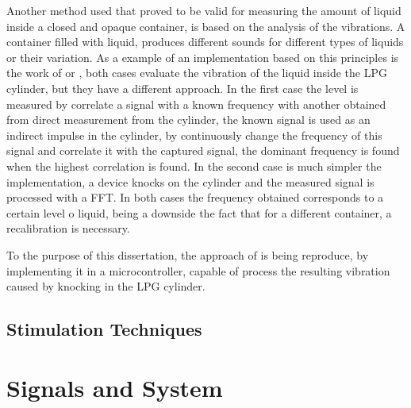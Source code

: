 Another method used that proved to be valid for measuring the amount of liquid inside a closed and opaque container, is based on the analysis of the vibrations. A container filled with liquid, produces different sounds for different types of liquids or their variation. As a example of an implementation based on this principles is the work of \citeauthor{jahnLevelSensorFluids2014a} or \citeauthor{wuAnalysisImplementationNoncontact2016a}, both cases evaluate the vibration of the liquid inside the LPG cylinder, but they have a different approach. In the first case the level is measured by correlate a signal with a known frequency with another obtained from direct measurement from the cylinder, the known signal is used as an indirect impulse in the cylinder, by continuously change the frequency of this signal and correlate it with the captured signal, the dominant frequency is found when the highest correlation is found. In the second case is much simpler the implementation, a device knocks on the cylinder and the measured signal is processed with a FFT. In both cases the frequency obtained corresponds to a certain level o liquid, being a downside the fact that for a different container, a recalibration is necessary\cite{jahnLevelSensorFluids2014a}\cite{wuAnalysisImplementationNoncontact2016a}. 

To the purpose of this dissertation, the approach of \citeauthor{wuAnalysisImplementationNoncontact2016a} is being reproduce, by implementing it in a microcontroller, capable of process the resulting vibration caused by knocking in the LPG cylinder. 
\subsection{Stimulation Techniques}


\section{Signals and System}


